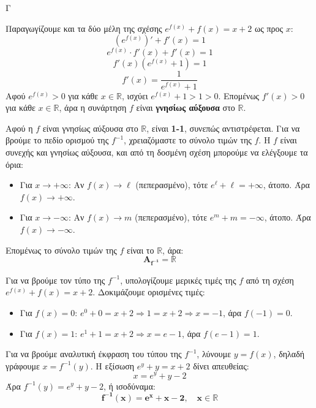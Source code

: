 \begin{thema}{Γ}
\begin{erwthma}
\item Παραγωγίζουμε και τα δύο μέλη της σχέσης $e^{f(x)} + f(x) = x + 2$ ως προς $x$:
\[ \left( e^{f(x)} \right)' + f'(x) = 1 \]
\[ e^{f(x)} \cdot f'(x) + f'(x) = 1 \]
\[ f'(x) \left( e^{f(x)} + 1 \right) = 1 \]
\[ f'(x) = \frac{1}{e^{f(x)} + 1} \]
Αφού $e^{f(x)} > 0$ για κάθε $x \in \mathbb{R}$, ισχύει $e^{f(x)} + 1 > 1 > 0$.
Επομένως $f'(x) > 0$ για κάθε $x \in \mathbb{R}$, άρα η συνάρτηση $f$ είναι \textbf{γνησίως αύξουσα} στο $\mathbb{R}$.

\item Αφού η $f$ είναι γνησίως αύξουσα στο $\mathbb{R}$, είναι \textbf{1-1}, συνεπώς αντιστρέφεται.
Για να βρούμε το πεδίο ορισμού της $f^{-1}$, χρειαζόμαστε το σύνολο τιμών της $f$.
Η $f$ είναι συνεχής και γνησίως αύξουσα, και από τη δοσμένη σχέση μπορούμε να ελέγξουμε τα όρια:
\begin{itemize}
    \item Για $x \to +\infty$: Αν $f(x) \to \ell$ (πεπερασμένο), τότε $e^{\ell} + \ell = +\infty$, άτοπο. Άρα $f(x) \to +\infty$.
    \item Για $x \to -\infty$: Αν $f(x) \to m$ (πεπερασμένο), τότε $e^{m} + m = -\infty$, άτοπο. Άρα $f(x) \to -\infty$.
\end{itemize}
Επομένως το σύνολο τιμών της $f$ είναι το $\mathbb{R}$, άρα:
\[ \boldsymbol{A_{f^{-1}} = \mathbb{R}} \]

\item Για να βρούμε τον τύπο της $f^{-1}$, υπολογίζουμε μερικές τιμές της $f$ από τη σχέση $e^{f(x)} + f(x) = x + 2$.
Δοκιμάζουμε ορισμένες τιμές:
\begin{itemize}
    \item Για $f(x) = 0$: $e^0 + 0 = x + 2 \Rightarrow 1 = x + 2 \Rightarrow x = -1$, άρα $f(-1) = 0$.
    \item Για $f(x) = 1$: $e^1 + 1 = x + 2 \Rightarrow x = e - 1$, άρα $f(e-1) = 1$.
\end{itemize}
Για να βρούμε αναλυτική έκφραση του τύπου της $f^{-1}$, λύνουμε $y = f(x)$, δηλαδή γράφουμε $x = f^{-1}(y)$.
Η εξίσωση $e^y + y = x + 2$ δίνει απευθείας:
\[ x = e^y + y - 2 \]
Άρα $f^{-1}(y) = e^y + y - 2$, ή ισοδύναμα:
\[ \boldsymbol{f^{-1}(x) = e^x + x - 2, \quad x \in \mathbb{R}} \]


\end{erwthma}
\end{thema}
